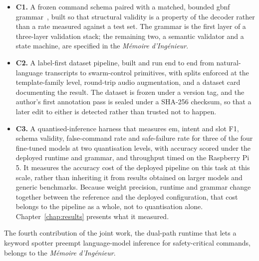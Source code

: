 \begin{itemize}
    \item \textbf{C1.} A frozen command schema paired with a matched, bounded \gls{gbnf}
    grammar~\cite{llamacpp}, built so that structural validity is a property of the decoder
    rather than a rate measured against a test set. The grammar is the first layer of a
    three-layer validation stack; the remaining two, a semantic validator and a state machine,
    are specified in the \emph{M\'emoire d'Ing\'enieur}.
    \item \textbf{C2.} A label-first dataset pipeline, built and run end to end from natural-language
    transcripts to swarm-control primitives, with splits enforced at the template-family level,
    round-trip audio augmentation, and a dataset card documenting the result. The dataset is
    frozen under a version tag, and the author's first annotation pass is sealed under a SHA-256
    checksum, so that a later edit to either is detected rather than trusted not to happen.
    \item \textbf{C3.} A quantised-inference harness that measures \gls{em}, intent and slot
    F1, schema validity, false-command rate and safe-failure rate for three of the four fine-tuned
    models at two
    quantisation levels, with accuracy scored under the deployed runtime and grammar, and
    throughput timed on the Raspberry Pi 5. It measures the accuracy cost of the deployed pipeline
    on this task at this scale, rather than inheriting it from results obtained on larger models
    and generic benchmarks. Because weight precision, runtime and grammar change together between
    the reference and the deployed configuration, that cost belongs to the pipeline as a whole, not
    to quantisation alone. Chapter~\ref{chap:results} presents what it measured.
\end{itemize}

The fourth contribution of the joint work, the dual-path runtime that lets a keyword spotter
preempt language-model inference for safety-critical commands, belongs to the \emph{M\'emoire
d'Ing\'enieur}.

\clearpage

